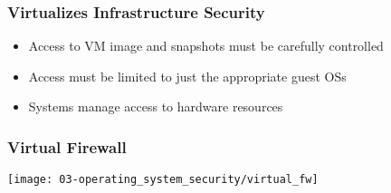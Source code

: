 \subsubsection{Virtualizes Infrastructure Security}
\begin{itemize}
    \item Access to VM image and snapshots must be carefully controlled
    \item Access must be limited to just the appropriate guest OSs
    \item Systems manage access to hardware resources
\end{itemize}

\subsubsection{Virtual Firewall}
\begin{center}
    \texttt{[image: 03-operating\_system\_security/virtual\_fw]}
    \vspace{-8pt}
\end{center}


